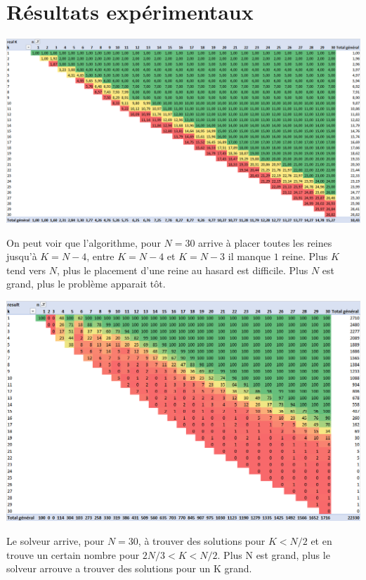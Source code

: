 \documentclass[a4paper, 10pt]{article}
\begin{document}
		\newpage
		\section{Résultats expérimentaux}
			\begin{center} \includegraphics[width=\textwidth]{realK30.png} \end{center}

            On peut voir que l'algorithme, pour $N=30$ arrive à placer toutes les reines jusqu'à $K=N-4$, entre $K=N-4$ et $K=N-3$ il manque $1$ reine. Plus $K$ tend vers $N$, plus le placement d'une reine au hasard est difficile. Plus $N$ est grand, plus le problème apparait tôt.

			\begin{center} \includegraphics[width=\textwidth]{result30.png} \end{center}

            Le solveur arrive, pour $N=30$, à trouver des solutions pour $K<N/2$ et en trouve un certain nombre pour $2N/3<K<N/2$. Plus N est grand, plus le solveur arrouve a trouver des solutions pour un K grand.
\end{document}
